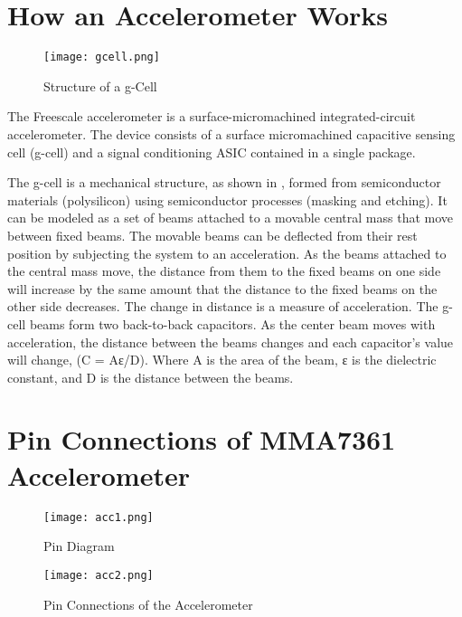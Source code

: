 \documentclass[a4paper,12 pt]{article}
\begin{document}
\section{How an Accelerometer Works } 
\vspace {5 mm}
\begin{figure}[h]
\begin{center}
\texttt{[image: gcell.png]}
\caption{Structure of a g-Cell}
\label{fig:1}
\end{center}
\end{figure}
\vspace{-20 pt}
The Freescale accelerometer is a surface-micromachined integrated-circuit accelerometer. The device consists of a surface micromachined capacitive sensing cell (g-cell) and a signal conditioning ASIC contained in a single package.


The g-cell is a mechanical structure, as shown in , formed from semiconductor materials (polysilicon) using semiconductor processes (masking and etching). It can be modeled as a set of beams attached to a movable central mass that move between fixed beams. The movable beams can be deflected from their rest position by subjecting the system to an acceleration. As the beams attached to the central mass move, the distance from them to the fixed beams on one side will increase by the same amount that the distance to the fixed beams on the other side decreases. The change in distance is a measure of acceleration. The g-cell beams form two back-to-back capacitors. As the center beam moves with acceleration, the distance between the beams changes and each capacitor's value will change, (C = Aε/D). Where A is the area of the beam, ε is the dielectric constant, and  D is the distance between the beams.

\pagebreak

\section{Pin Connections of MMA7361 Accelerometer }
\vspace {5 mm}
\begin{figure}[h]
\begin{center}
\texttt{[image: acc1.png]}
\caption{Pin Diagram}
\label{fig:2}

\texttt{[image: acc2.png]}
\caption{Pin Connections of the Accelerometer}
\label{fig:3}
\end{center}
\end{figure}
\end{document}
